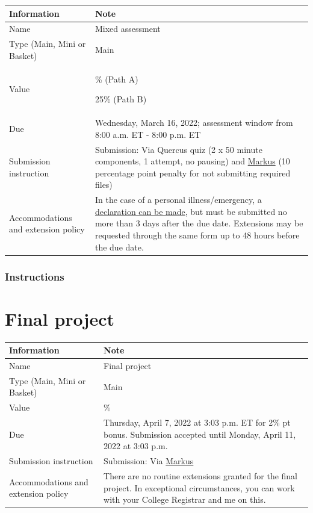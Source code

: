\documentclass[
  openany]{book}
\begin{document}
\begin{longtable}[]{@{}
  >{\raggedright\arraybackslash}p{}
  >{\raggedright\arraybackslash}p{}@{}}
\toprule
\textbf{Information} & \textbf{Note} \\
\midrule
\endhead
Name & Mixed assessment \\
Type (Main, Mini or Basket) & Main \\
Value & 20\% (Path A)

25\% (Path B) \\
Due & Wednesday, March 16, 2022; assessment window from 8:00 a.m. ET - 8:00 p.m. ET \\
Submission instruction & Submission: Via Quercus quiz (2 x 50 minute components, 1 attempt, no pausing) and \href{https://markus-ds.teach.cs.toronto.edu/}{Markus} (10 percentage point penalty for not submitting required files) \\
Accommodations and extension policy & In the case of a personal illness/emergency, a \href{https://forms.office.com/Pages/ResponsePage.aspx?id=JsKqeAMvTUuQN7RtVsVSEOKHUU3SzAJJhmOKjJhDWEpUNTFDSzhZTFlXUzVYMVlNM1FEUTRZMkVWOC4u}{declaration can be made}, but must be submitted no more than 3 days after the due date. Extensions may be requested through the same form up to 48 hours before the due date. \\
\bottomrule
\end{longtable}

\hypertarget{instructions-3}{%
\subsection{Instructions}\label{instructions-3}}

\hypertarget{final-project}{%
\chapter{Final project}\label{final-project}}

\begin{longtable}[]{@{}
  >{\raggedright\arraybackslash}p{}
  >{\raggedright\arraybackslash}p{}@{}}
\toprule
\textbf{Information} & \textbf{Note} \\
\midrule
\endhead
Name & Final project \\
Type (Main, Mini or Basket) & Main \\
Value & 45\% \\
Due & Thursday, April 7, 2022 at 3:03 p.m. ET for 2\% pt bonus. Submission accepted until Monday, April 11, 2022 at 3:03 p.m. \\
Submission instruction & Submission: Via \href{https://markus-ds.teach.cs.toronto.edu/}{Markus} \\
Accommodations and extension policy & There are no routine extensions granted for the final project. In exceptional circumstances, you can work with your College Registrar and me on this. \\
\bottomrule
\end{longtable}
\end{document}
